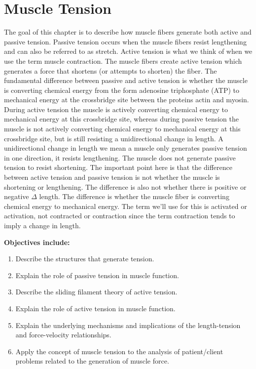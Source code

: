 \chapter{Muscle Tension}\label{chp:tension}

\minitoc

The goal of this chapter is to describe how muscle fibers generate both active and passive tension. Passive tension occurs when the muscle fibers resist lengthening and can also be referred to as stretch. Active tension is what we think of when we use the term muscle contraction. The muscle fibers create active tension which generates a force that shortens (or attempts to shorten) the fiber.  The fundamental difference between passive and active tension is whether the muscle is converting chemical energy from the form adenosine triphosphate (ATP) to mechanical energy at the crossbridge site between the proteins actin and myosin. During active tension the muscle is actively converting chemical energy to mechanical energy at this crossbridge site, whereas during passive tension the muscle is not actively converting chemical energy to mechanical energy at this crossbridge site, but is still resisting a unidirectional change in length. A unidirectional change in length we mean a muscle only generates passive tension in one direction, it resists lengthening. The muscle does not generate passive tension to resist shortening. The important point here is that the difference between active tension and passive tension is not whether the muscle is shortening or lengthening. The difference is also not whether there is positive or negative $\Delta$ length. The difference is whether the muscle fiber is converting chemical energy to mechanical energy. The term we’ll use for this is activated or activation, not contracted or contraction since the term contraction tends to imply a change in length. 

\vspace{5mm}

\textbf{Objectives include:}
\begin{enumerate}
    \item Describe the structures that generate tension.
    \item Explain the role of passive tension in muscle function.
    \item Describe the sliding filament theory of active tension.
    \item Explain the role of active tension in muscle function.
    \item Explain the underlying mechanisms and implications of the length-tension and force-velocity relationships.
   \item Apply the concept of muscle tension to the analysis of patient/client problems related to the generation of muscle force.
\end{enumerate}

